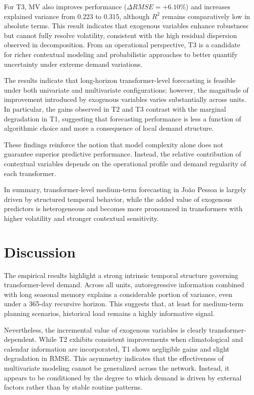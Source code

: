 For T3, MV also improves performance ($\Delta RMSE = +6.10\%$) and increases explained variance from 0.223 to 0.315, although $R^2$ remains comparatively low in absolute terms. This result indicates that exogenous variables enhance robustness but cannot fully resolve volatility, consistent with the high residual dispersion observed in decomposition. From an operational perspective, T3 is a candidate for richer contextual modeling and probabilistic approaches to better quantify uncertainty under extreme demand variations.

The results indicate that long-horizon transformer-level forecasting is feasible under both univariate and multivariate configurations; however, the magnitude of improvement introduced by exogenous variables varies substantially across units. In particular, the gains observed in T2 and T3 contrast with the marginal degradation in T1, suggesting that forecasting performance is less a function of algorithmic choice and more a consequence of local demand structure.

These findings reinforce the notion that model complexity alone does not guarantee superior predictive performance. Instead, the relative contribution of contextual variables depends on the operational profile and demand regularity of each transformer.

In summary, transformer-level medium-term forecasting in João Pessoa is largely driven by structured temporal behavior, while the added value of exogenous predictors is heterogeneous and becomes more pronounced in transformers with higher volatility and stronger contextual sensitivity.


\section{Discussion}
\label{sec:discussion}

The empirical results highlight a strong intrinsic temporal structure governing transformer-level demand. Across all units, autoregressive information combined with long seasonal memory explains a considerable portion of variance, even under a 365-day recursive horizon. This suggests that, at least for medium-term planning scenarios, historical load remains a highly informative signal.

Nevertheless, the incremental value of exogenous variables is clearly transformer-dependent. While T2 exhibits consistent improvements when climatological and calendar information are incorporated, T1 shows negligible gains and slight degradation in RMSE. This asymmetry indicates that the effectiveness of multivariate modeling cannot be generalized across the network. Instead, it appears to be conditioned by the degree to which demand is driven by external factors rather than by stable routine patterns.

